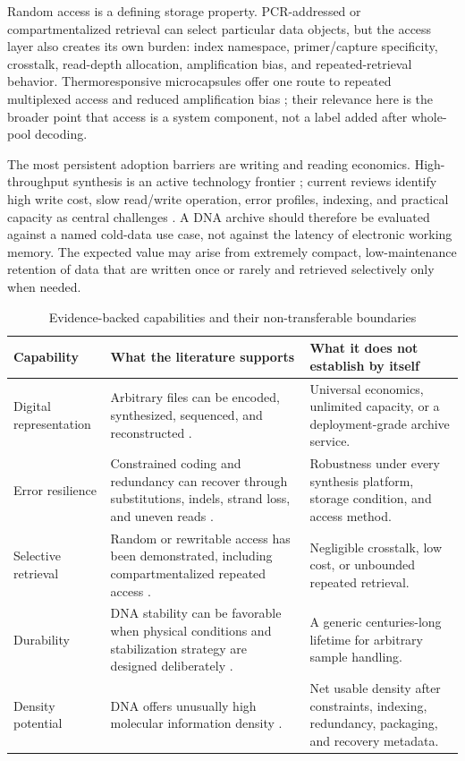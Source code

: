 \documentclass[conference]{IEEEtran}
\begin{document}
Random access is a defining storage property. PCR-addressed or compartmentalized retrieval can select particular data objects, but the access layer also creates its own burden: index namespace, primer/capture specificity, crosstalk, read-depth allocation, amplification bias, and repeated-retrieval behavior. Thermoresponsive microcapsules offer one route to repeated multiplexed access and reduced amplification bias \cite{bogels2023}; their relevance here is the broader point that access is a system component, not a label added after whole-pool decoding.

The most persistent adoption barriers are writing and reading economics. High-throughput synthesis is an active technology frontier \cite{yu2024}; current reviews identify high write cost, slow read/write operation, error profiles, indexing, and practical capacity as central challenges \cite{doricchi2022,raza2023,sensintaffar2025}. A DNA archive should therefore be evaluated against a named cold-data use case, not against the latency of electronic working memory. The expected value may arise from extremely compact, low-maintenance retention of data that are written once or rarely and retrieved selectively only when needed.

\begin{table}[t]
\caption{Evidence-backed capabilities and their non-transferable boundaries}
\label{tab:evidence}
\centering
\footnotesize
\begin{tabular}{p{} p{} p{}}
\toprule
\textbf{Capability} & \textbf{What the literature supports} & \textbf{What it does not establish by itself}\\
\midrule
Digital representation & Arbitrary files can be encoded, synthesized, sequenced, and reconstructed \cite{church2012,goldman2013,bornholt2016}. & Universal economics, unlimited capacity, or a deployment-grade archive service.\\
Error resilience & Constrained coding and redundancy can recover through substitutions, indels, strand loss, and uneven reads \cite{erlich2017,heckel2019,antkowiak2020,welzel2023}. & Robustness under every synthesis platform, storage condition, and access method.\\
Selective retrieval & Random or rewritable access has been demonstrated, including compartmentalized repeated access \cite{organick2018,yazdi2015,bogels2023}. & Negligible crosstalk, low cost, or unbounded repeated retrieval.\\
Durability & DNA stability can be favorable when physical conditions and stabilization strategy are designed deliberately \cite{matange2021}. & A generic centuries-long lifetime for arbitrary sample handling.\\
Density potential & DNA offers unusually high molecular information density \cite{church2012,doricchi2022}. & Net usable density after constraints, indexing, redundancy, packaging, and recovery metadata.\\
\bottomrule
\end{tabular}
\end{table}
\end{document}
